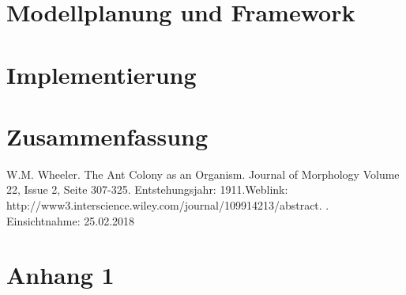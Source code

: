 \documentclass[a4paper, 11pt]{article}
\makeatletter
\newcommand*{\appendixtoc}{%
	\begingroup
	\edef\@alltocdepth{\the\value{tocdepth}}%
	\setcounter{tocdepth}{-10000}%
	\renewcommand*{\contentsname}{%
		Verzeichnis der Anh\"ange}%
	\renewcommand*{\appendixattoc}{%
		\setcounter{tocdepth}{\@alltocdepth}%
	}%
	\tableofcontents%
	\setcounter{tocdepth}{\@alltocdepth}%
	\endgroup
}
\newcommand*{\appendixattoc}{%
}
\makeatother
\begin{document}
\section{Modellplanung und Framework}
\section{Implementierung}
\section{Zusammenfassung}

\newpage
\begin{thebibliography}{sotief}
	W.M. Wheeler. The Ant Colony as an Organism. Journal of Morphology Volume 22, Issue 2, Seite 307-325. Entstehungsjahr: 1911.\newline\newline Weblink:
	http://www3.interscience.wiley.com/journal/109914213/abstract. . Einsichtnahme: 25.02.2018
\end{thebibliography}
\newpage
\appendixtoc
\newpage
\section{Anhang 1} 
\end{document}

